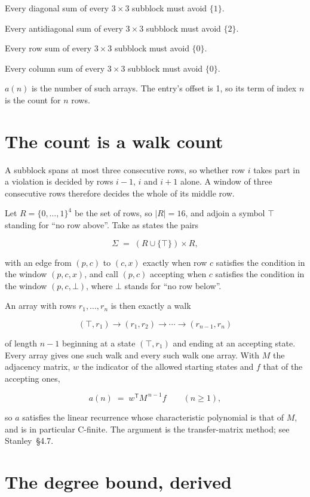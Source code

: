 \documentclass[11pt]{article}
\theoremstyle{definition}
\begin{document}
Every diagonal sum of every $3\times3$ subblock must avoid $\{1\}$.

Every antidiagonal sum of every $3\times3$ subblock must avoid $\{2\}$.

Every row sum of every $3\times3$ subblock must avoid $\{0\}$.

Every column sum of every $3\times3$ subblock must avoid $\{0\}$.

$a(n)$ is the number of such arrays. The entry's offset is 1, so its term of index $n$ is the count for $n$ rows.

\section{The count is a walk count}

A subblock spans at most three consecutive rows, so whether row $i$ takes part in a violation is decided by rows $i-1$, $i$ and $i+1$ alone. A window of three consecutive rows therefore decides the whole of its middle row.

Let $R = \{0,\dots,1\}^{4}$ be the set of rows, so $|R| = 16$, and adjoin a symbol $\top$ standing for ``no row above''. Take as states the pairs

\[\Sigma \;=\; (R \cup \{\top\}) \times R,\]

with an edge from $(p,c)$ to $(c,x)$ exactly when row $c$ satisfies the condition in the window $(p,c,x)$, and call $(p,c)$ accepting when $c$ satisfies the condition in the window $(p,c,\bot)$, where $\bot$ stands for ``no row below''.

An array with rows $r_1,\dots,r_n$ is then exactly a walk

\[(\top,r_1) \to (r_1,r_2) \to \cdots \to (r_{n-1},r_n)\]

of length $n-1$ beginning at a state $(\top,r_1)$ and ending at an accepting state. Every array gives one such walk and every such walk one array. With $M$ the adjacency matrix, $w$ the indicator of the allowed starting states and $f$ that of the accepting ones,

\[a(n) \;=\; w^{\mathsf T} M^{\,n-1} f \qquad (n \ge 1),\]

so $a$ satisfies the linear recurrence whose characteristic polynomial is that of $M$, and is in particular C-finite. The argument is the transfer-matrix method; see Stanley~\S4.7.

\section{The degree bound, derived}
\end{document}
